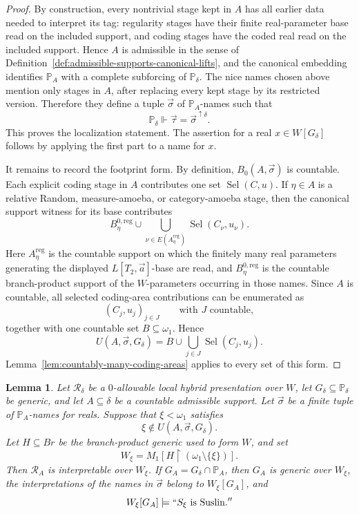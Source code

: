 \documentclass[a4paper,11pt]{article}
\newtheorem{lemma}[theorem]{Lemma}
\begin{document}
\begin{proof}
By construction, every nontrivial stage kept in \(A\) has all earlier data
needed to interpret its tag: regularity stages have their finite real-parameter
base read on the included support, and coding stages have the coded real read
on the included support.  Hence \(A\) is admissible in the sense of
Definition~\ref{def:admissible-supports-canonical-lifts}, and the canonical
embedding identifies \(\mathbb P_A\) with a complete subforcing of
\(\mathbb P_\delta\).  The nice names chosen above mention only stages in
\(A\), after replacing every kept stage by its restricted version.  Therefore
they define a tuple \(\vec\sigma\) of \(\mathbb P_A\)-names such that
\[
   \mathbb P_\delta\Vdash
   \vec\tau=\vec\sigma^{\uparrow\delta}.
\]
This proves the localization statement.  The assertion for a real
\(x\in W[G_\delta]\) follows by applying the first part to a name for \(x\).

It remains to record the footprint form.  By definition,
\(B_0(A,\vec\sigma)\) is countable.  Each explicit coding stage in \(A\)
contributes one set \(\operatorname{Sel}(C,u)\).  If \(\eta\in A\) is a
relative Random, measure-amoeba, or category-amoeba stage, then the canonical
support witness for its base contributes
\[
   B^{0,\mathrm{reg}}_\eta
   \cup
   \bigcup_{\nu\in E(A^{\mathrm{reg}}_\eta)}
      \operatorname{Sel}(C_\nu,u_\nu).
\]
Here \(A^{\mathrm{reg}}_\eta\) is the countable support on which the finitely
many real parameters generating the displayed \(L[T_2,\vec a]\)-base are read,
and \(B^{0,\mathrm{reg}}_\eta\) is the countable branch-product support of the
\(W\)-parameters occurring in those names.  Since \(A\) is countable, all
selected coding-area contributions can be enumerated as
\[
   (C_j,u_j)_{j\in J}
   \qquad\text{with }J\text{ countable},
\]
together with one countable set \(B\subseteq\omega_1\).  Hence
\[
   U(A,\vec\sigma,G_\delta)
   =B\cup\bigcup_{j\in J}\operatorname{Sel}(C_j,u_j).
\]
Lemma~\ref{lem:countably-many-coding-areas} applies to every set of this form.
\end{proof}

\begin{lemma}
\label{lem:omit-unused-branch-coordinate}
Let \(\mathcal R_\delta\) be a \(0\)-allowable local hybrid presentation over
\(W\), let \(G_\delta\subseteq\mathbb P_\delta\) be generic, and let
\(A\subseteq\delta\) be a countable admissible support.  Let \(\vec\sigma\) be a
finite tuple of \(\mathbb P_A\)-names for reals.  Suppose that
\(\xi<\omega_1\) satisfies
\[
   \xi\notin U(A,\vec\sigma,G_\delta).
\]
Let \(H\subseteq Br\) be the branch-product generic used to form \(W\), and set
\[
   W_\xi=M_1[H\upharpoonright(\omega_1\setminus\{\xi\})].
\]
Then \(\mathcal R_A\) is interpretable over \(W_\xi\).  If
\(G_A=G_\delta\cap\mathbb P_A\), then \(G_A\) is generic over \(W_\xi\), the
interpretations of the names in \(\vec\sigma\) belong to \(W_\xi[G_A]\), and
\[
   W_\xi[G_A]\models ``S_\xi\text{ is Suslin}.''
\]
\end{lemma}
\end{document}
